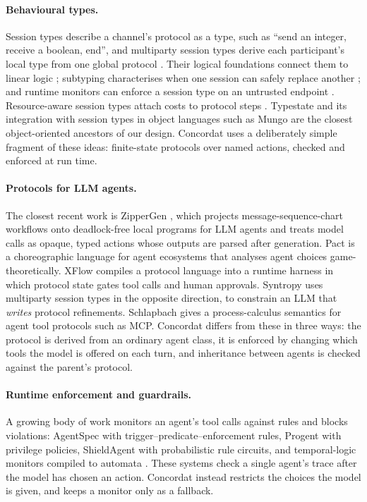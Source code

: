 \documentclass[11pt]{article}
\begin{document}
\paragraph{Behavioural types.}
Session types describe a channel's protocol as a type, such as ``send an integer,
receive a boolean, end'', and multiparty session types derive each participant's local
type from one global protocol \citep{honda1993types,honda1998language,honda2008multiparty}.
Their logical foundations connect them to linear logic
\citep{caires2010session,wadler2012propositions}; subtyping characterises when one
session can safely replace another \citep{gay2005subtyping}; and runtime monitors can
enforce a session type on an untrusted endpoint \citep{bocchi2013monitoring}.
Resource-aware session types attach costs to protocol steps \citep{das2018resource}.
Typestate \citep{strom1986typestate} and its integration with session types in object
languages such as Mungo \citep{kouzapas2016mungo} are the closest object-oriented
ancestors of our design. Concordat uses a deliberately simple fragment of these ideas:
finite-state protocols over named actions, checked and enforced at run time.

\paragraph{Protocols for LLM agents.}
The closest recent work is ZipperGen \citep{bollig2026zippergen}, which projects
message-sequence-chart workflows onto deadlock-free local programs for LLM agents and
treats model calls as opaque, typed actions whose outputs are parsed after generation.
Pact \citep{gopinathan2026pact} is a choreographic language for agent ecosystems that
analyses agent choices game-theoretically. XFlow \citep{li2026xflow} compiles a
protocol language into a runtime harness in which protocol state gates tool calls and
human approvals. Syntropy \citep{li2026syntropy} uses multiparty session types in the
opposite direction, to constrain an LLM that \emph{writes} protocol refinements.
Schlapbach \citep{schlapbach2026formal} gives a process-calculus semantics for agent
tool protocols such as MCP. Concordat differs from these in three ways: the protocol is
derived from an ordinary agent class, it is enforced by changing which tools the model
is offered on each turn, and inheritance between agents is checked against the parent's
protocol.

\paragraph{Runtime enforcement and guardrails.}
A growing body of work monitors an agent's tool calls against rules and blocks
violations: AgentSpec \citep{wang2025agentspec} with trigger--predicate--enforcement
rules, Progent \citep{shi2025progent} with privilege policies, ShieldAgent
\citep{chen2025shieldagent} with probabilistic rule circuits, and temporal-logic monitors
compiled to automata \citep{xiao2026contracts,elkoussy2026agentltl}. These systems check
a single agent's trace after the model has chosen an action. Concordat instead restricts
the choices the model is given, and keeps a monitor only as a fallback.
\end{document}
